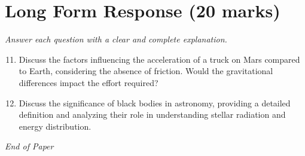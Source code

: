\documentclass[12pt]{article}
\begin{document}
\section*{Long Form Response (20 marks)}
\textit{Answer each question with a clear and complete explanation.}
\begin{enumerate}[label=\arabic*.]
\setcounter{enumi}{10}
\item Discuss the factors influencing the acceleration of a truck on Mars compared to Earth, considering the absence of friction. Would the gravitational differences impact the effort required?
\item Discuss the significance of black bodies in astronomy, providing a detailed definition and analyzing their role in understanding stellar radiation and energy distribution.
\end{enumerate}

\vfill
\noindent\textit{End of Paper}
\end{document}
